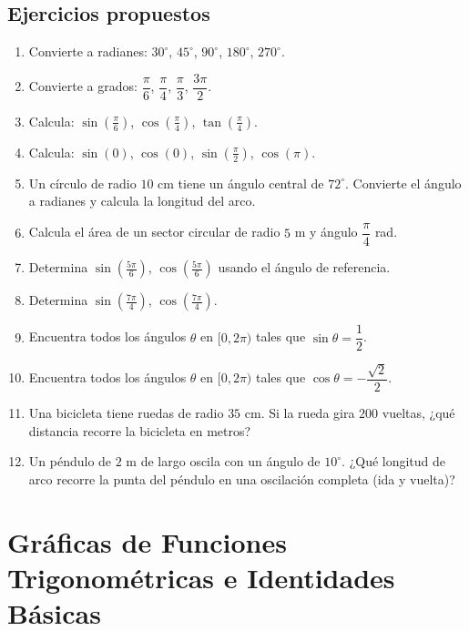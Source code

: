 \documentclass[12pt, letterpaper]{article}
\begin{document}
\subsection{Ejercicios propuestos}

\begin{enumerate}[series=ejercicios, leftmargin=*]
  \item \facil{} Convierte a radianes: $30^\circ$, $45^\circ$, $90^\circ$, $180^\circ$, $270^\circ$.
  \item \facil{} Convierte a grados: $\dfrac{\pi}{6}$, $\dfrac{\pi}{4}$, $\dfrac{\pi}{3}$, $\dfrac{3\pi}{2}$.
  \item \facil{} Calcula: $\sin\left(\frac{\pi}{6}\right)$, $\cos\left(\frac{\pi}{4}\right)$, $\tan\left(\frac{\pi}{4}\right)$.
  \item \facil{} Calcula: $\sin(0)$, $\cos(0)$, $\sin\left(\frac{\pi}{2}\right)$, $\cos(\pi)$.
  \item \medio{} Un círculo de radio $10$ cm tiene un ángulo central de $72^\circ$. Convierte el ángulo a radianes y calcula la longitud del arco.
  \item \medio{} Calcula el área de un sector circular de radio $5$ m y ángulo $\dfrac{\pi}{4}$ rad.
  \item \medio{} Determina $\sin\left(\frac{5\pi}{6}\right)$, $\cos\left(\frac{5\pi}{6}\right)$ usando el ángulo de referencia.
  \item \medio{} Determina $\sin\left(\frac{7\pi}{4}\right)$, $\cos\left(\frac{7\pi}{4}\right)$.
  \item \dificil{} Encuentra todos los ángulos $\theta$ en $[0, 2\pi)$ tales que $\sin\theta = \dfrac{1}{2}$.
  \item \dificil{} Encuentra todos los ángulos $\theta$ en $[0, 2\pi)$ tales que $\cos\theta = -\dfrac{\sqrt{2}}{2}$.
  \item \dificil{} Una bicicleta tiene ruedas de radio $35$ cm. Si la rueda gira $200$ vueltas, ¿qué distancia recorre la bicicleta en metros?
  \item \dificil{} Un péndulo de $2$ m de largo oscila con un ángulo de $10^\circ$. ¿Qué longitud de arco recorre la punta del péndulo en una oscilación completa (ida y vuelta)?
\end{enumerate}

\newpage


\section{Gráficas de Funciones Trigonométricas e Identidades Básicas}
\end{document}
